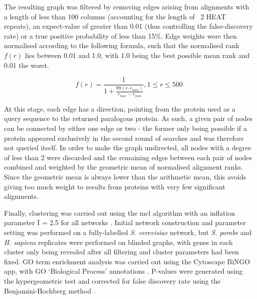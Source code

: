 \documentclass[a4paper,11pt,twoside,openright]{scrbook}
\begin{document}
The resulting graph was filtered by removing edges arising from alignments with a length of less than 100 columns (accounting for the length of ~2 HEAT repeats), an expect-value of greater than 0.01 (thus controlling the false-discovery rate) or a true positive probability of less than 15\%. Edge weights were then normalised according to the following formula, such that the normalised rank $f(r)$ lies between 0.01 and 1.0, with 1.0 being the best possible mean rank and 0.01 the worst.

\begin{displaymath}
    f(r) = \frac{1}{1 + \frac{99(r – r_{min} )}{r_{max} - r_{min}}}, 1 \leq r \leq 500
\end{displaymath}

At this stage, each edge has a direction, pointing from the protein used as a query sequence to the returned paralogous protein. As such, a given pair of nodes can be connected by either one edge or two - the former only being possible if a protein appeared exclusively in the second round of searches and was therefore not queried itself. In order to make the graph undirected, all nodes with a degree of less than 2 were discarded and the remaining edges between each pair of nodes combined and weighted by the geometric mean of normalised alignment ranks. Since the geometric mean is always lower than the arithmetic mean, this avoids giving too much weight to results from proteins with very few significant alignments.

Finally, clustering was carried out using the mcl algorithm with an inflation parameter I = 2.5 for all networks \cite{VanDongen2000}. Initial network construction and parameter setting was performed on a fully-labelled \textit{S. cerevisiae} network, but \textit{S. pombe} and \textit{H. sapiens} replicates were performed on blinded graphs, with genes in each cluster only being revealed after all filtering and cluster parameters had been fixed. GO term enrichment analysis was carried out using the Cytoscape BiNGO app, with GO `Biological Process' annotations \cite{Maere2005}. P-values were generated using the hypergeometric test and corrected for false discovery rate using the Benjamini-Hochberg method \cite{Benjamini1995,Maere2005}.
\end{document}

